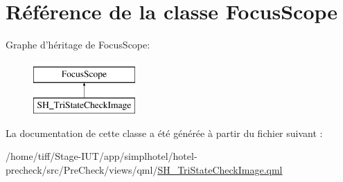\hypertarget{classFocusScope}{\section{Référence de la classe Focus\-Scope}
\label{classFocusScope}
}
Graphe d'héritage de Focus\-Scope\-:\begin{figure}[H]
\begin{center}
\leavevmode
\includegraphics[height=2.000000cm]{classFocusScope}
\end{center}
\end{figure}


La documentation de cette classe a été générée à partir du fichier suivant \-:\begin{DoxyCompactItemize}
\item 
/home/tiff/\-Stage-\/\-I\-U\-T/app/simplhotel/hotel-\/precheck/src/\-Pre\-Check/views/qml/\hyperlink{SH__TriStateCheckImage_8qml}{S\-H\-\_\-\-Tri\-State\-Check\-Image.\-qml}\end{DoxyCompactItemize}
